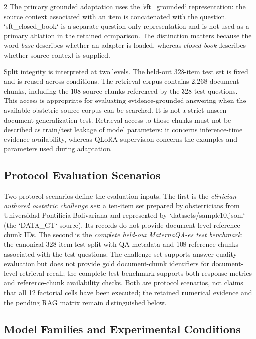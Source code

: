 \documentclass[11pt]{article}
\begin{document}
\begin{multicols}{2}
The primary grounded adaptation uses the `sft\_grounded` representation: the source context associated with an item is concatenated with the question. `sft\_closed\_book` is a separate question-only representation and is not used as a primary ablation in the retained comparison. The distinction matters because the word \textit{base} describes whether an adapter is loaded, whereas \textit{closed-book} describes whether source context is supplied.

Split integrity is interpreted at two levels. The held-out 328-item test set is fixed and is reused across conditions. The retrieval corpus contains 2,268 document chunks, including the 108 source chunks referenced by the 328 test questions. This access is appropriate for evaluating evidence-grounded answering when the available obstetric source corpus can be searched. It is not a strict unseen-document generalization test. Retrieval access to those chunks must not be described as train/test leakage of model parameters: it concerns inference-time evidence availability, whereas QLoRA supervision concerns the examples and parameters used during adaptation.

\subsection{Protocol Evaluation Scenarios}

Two protocol scenarios define the evaluation inputs. The first is the \textit{clinician-authored obstetric challenge set}: a ten-item set prepared by obstetricians from Universidad Pontificia Bolivariana and represented by `datasets/sample10.jsonl` (the `DATA\_GT` source). Its records do not provide document-level reference chunk IDs. The second is the \textit{complete held-out MaternaQA-es test benchmark}: the canonical 328-item test split with QA metadata and 108 reference chunks associated with the test questions. The challenge set supports answer-quality evaluation but does not provide gold document-chunk identifiers for document-level retrieval recall; the complete test benchmark supports both response metrics and reference-chunk availability checks. Both are protocol scenarios, not claims that all 12 factorial cells have been executed; the retained numerical evidence and the pending RAG matrix remain distinguished below.

\subsection{Model Families and Experimental Conditions}


\end{multicols}
\end{document}

